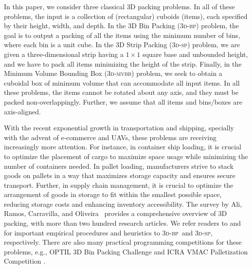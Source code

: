 \documentclass[a4paper,UKenglish,cleveref, autoref, thm-restate]{lipics-v2021}
\newcommand{\tbp}{\textsc{3d-bp}\xspace}
\newcommand{\tsp}{\textsc{3d-sp}\xspace}
\newcommand{\tmvc}{\textsc{3d-mvbb}\xspace}
\begin{document}
In this paper, we consider three classical 3D packing problems. 
In all of these problems, the input is a collection of (rectangular) cuboids (items), each specified by their height, width, and depth.
In the 3D Bin Packing (\tbp) problem, the goal is to output a packing of all the items using the minimum number of bins, where each bin is a unit cube. In the 3D Strip Packing (\tsp) problem, we are given a three-dimensional strip having a $1\times 1$ square base and unbounded height, and we have to pack all items minimizing the height of the strip. Finally, in the Minimum Volume Bounding Box (\tmvc) problem, we seek to obtain a cuboidal box of minimum volume that can accommodate all input items. 
In all these problems, the items cannot be rotated about any axis, and they must be packed non-overlappingly. Further, we assume that all items and bins/boxes are axis-aligned. 


With the recent exponential growth in transportation and shipping, specially with the advent of e-commerce and UAVs, these problems are receiving increasingly more attention. 
For instance, in container ship loading, it is crucial to optimize the placement of cargo to maximize space usage while minimizing the number of containers needed. In pallet loading, manufacturers strive to stack goods on pallets in a way that maximizes storage capacity and ensures secure transport. Further, in supply chain management, it is crucial to optimize the arrangement of goods in storage to fit within the smallest possible space, reducing storage costs and enhancing inventory accessibility.
The survey by Ali, Ramos, Carravilla, and Oliveira~\cite{ali2022line} provides a comprehensive overview of 3D packing, 
with more than two hundred research articles. 
 We refer readers to \cite{faroe2003guided, hifi2010linear, lodi2002heuristic, crainic2009ts2pack, parreno2010hybrid, crainic2008extreme,jin2003three,li2014genetic, mahvash2018column,mack2012heuristic} and \cite{george1980heuristic,bischoff1990comparative, allen2011hybrid,duong2015heuristics,wei2012reference,wauters2013effective} for important empirical procedures and heuristics to \tbp~and \tsp, respectively.
 There are also many practical programming competitions for these problems, e.g., OPTIL 3D Bin Packing Challenge \cite{optil} and  ICRA VMAC Palletization  Competition  \cite{vmac}.
\end{document}
